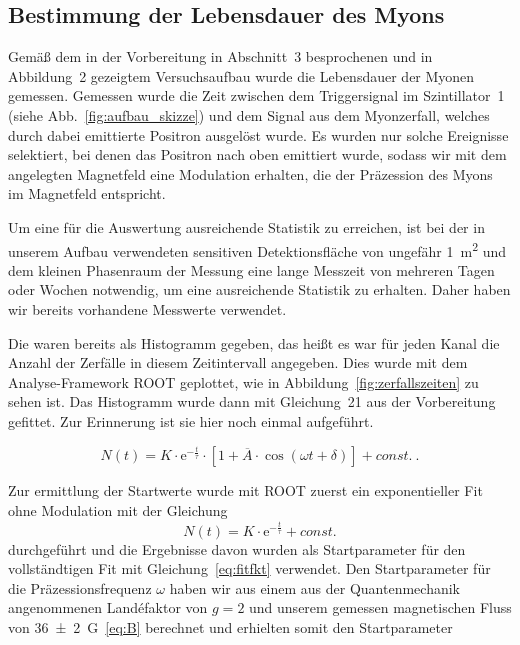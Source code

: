 \documentclass[a4paper,ngerman]{scrartcl}
\begin{document}
\clearpage
\subsection{Bestimmung der Lebensdauer des Myons}

Gemäß dem in der Vorbereitung in Abschnitt~3 besprochenen und in
Abbildung~2 gezeigtem Versuchsaufbau wurde die Lebensdauer der Myonen
gemessen. Gemessen wurde die Zeit zwischen dem Triggersignal im
Szintillator~1 (siehe Abb.~\ref{fig:aufbau_skizze}) und dem Signal aus dem Myonzerfall, welches durch dabei
emittierte Positron ausgelöst wurde. Es wurden nur solche Ereignisse
selektiert, bei denen das Positron nach oben emittiert wurde, sodass
wir mit dem angelegten Magnetfeld eine Modulation erhalten, die der
Präzession des Myons im Magnetfeld entspricht.

Um eine für die Auswertung ausreichende Statistik zu erreichen, ist
bei der in unserem Aufbau verwendeten sensitiven Detektionsfläche von ungefähr
\SI{1}{\square\meter} und dem kleinen Phasenraum der Messung eine
lange Messzeit von mehreren Tagen oder Wochen notwendig, um eine
ausreichende Statistik zu erhalten. Daher haben wir bereits vorhandene
Messwerte verwendet.

Die waren bereits als Histogramm gegeben, 
das heißt es war für jeden Kanal die Anzahl der Zerfälle in diesem Zeitintervall angegeben.
Dies  wurde mit dem Analyse-Framework ROOT geplottet, wie in
Abbildung~\ref{fig:zerfallszeiten} zu sehen ist. Das Histogramm  wurde dann mit
Gleichung~21 aus der Vorbereitung gefittet. Zur Erinnerung ist sie
hier noch einmal aufgeführt.

\begin{equation}
\label{eq:fitfkt}
N(t) = K \cdot \mathrm{e}^{- \frac{t}{\tau}} \cdot \left[ 1 + \overline{A} \cdot \cos(\omega t + \delta) \right] + const.~.
\end{equation}



Zur ermittlung der Startwerte wurde mit ROOT zuerst ein exponentieller
Fit ohne Modulation mit der Gleichung 
\begin{equation}
N(t) = K \cdot \mathrm{e}^{- \frac{t}{\tau}} + const.
\end{equation}
durchgeführt und die Ergebnisse davon wurden als Startparameter für
den vollständtigen Fit mit Gleichung~\ref{eq:fitfkt} verwendet. Den
Startparameter für die Präzessionsfrequenz $\omega$ haben wir aus
einem aus der Quantenmechanik angenommenen Landéfaktor von $g = 2$
und unserem gemessen magnetischen Fluss von \SI{36+-2}{G}~\eqref{eq:B} 
berechnet und erhielten somit den Startparameter
\end{document}
